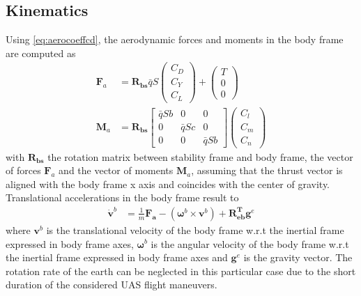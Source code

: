 \documentclass{ifacconf}
\newcommand{\mbf}[1]{\mathbf{#1}}
\providecommand{\mbf}[1]{\mathbf{#1}}
\newcommand{\Rbs}{{\ensuremath{\mbf{R_{b   s}}}}}
\newcommand{\Rbe}{{\ensuremath{\mbf{R^T_{e  b}}}}}
\newcommand{\qbar}{\ensuremath{\bar{q}}}
\begin{document}
\subsection{Kinematics}
Using \ref{eq:aerocoeffcd}, the aerodynamic forces and moments in the body frame are computed as
\begin{align}
\label{eq:coeff2realforcesandmoments}
\mathbf{F}_a
&=
\Rbs
\bar{q}
S
\begin{pmatrix}
C_D \\ 
C_Y \\
C_L 
\end{pmatrix}
+
\begin{pmatrix}
T \\ 
0 \\
0 
\end{pmatrix}\\
\mathbf{M}_a
&=
\Rbs
\begin{bmatrix}
\qbar S b & 0 & 0 \\
0 & \qbar S c & 0 \\
0& 0 & \qbar S b 
\end{bmatrix}
\begin{pmatrix}
C_l \\ 
C_m \\
C_n 
\end{pmatrix}
\end{align}
with $\Rbs$ the rotation matrix between stability frame and body frame, the vector of forces $\mathbf{F}_a$ and the vector of moments $\mathbf{M}_a$, assuming that the thrust vector is aligned with the body frame x axis and coincides with the center of gravity.
Translational accelerations in the body frame result to
\begin{align}
\label{eq:forces2accelerations}
\dot{\mathbf{v}}^b &= \frac{1}{m}\mathbf{F_a} 
- (\mathbf{\omega}^b \times \mathbf{v}^b) 
+
\Rbe
\mathbf{g}^e
\end{align}
where $\mathbf{v}^b$ is the translational velocity of the body frame w.r.t the inertial frame expressed in body frame axes, 
$\mathbf{\omega}^{b}$ is the angular velocity of the body frame w.r.t the inertial frame expressed in body frame axes and $\mathbf{g}^e$ is the gravity vector. The rotation rate of the earth can be neglected in this particular case due to the short duration of the considered UAS flight maneuvers.\\
\end{document}
